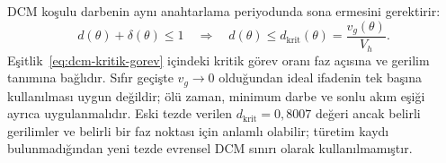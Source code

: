 DCM koşulu darbenin aynı anahtarlama periyodunda sona ermesini gerektirir:
\begin{equation}
  d(\theta)+\delta(\theta)\leq 1
  \quad\Longrightarrow\quad
  d(\theta)\leq d_{\mathrm{krit}}(\theta)=\frac{v_g(\theta)}{V_h}.
  \label{eq:dcm-kritik-gorev}
\end{equation}
Eşitlik~\eqref{eq:dcm-kritik-gorev} içindeki kritik görev oranı faz açısına ve gerilim tanımına bağlıdır. Sıfır geçişte $v_g\rightarrow0$ olduğundan ideal ifadenin tek başına kullanılması uygun değildir; ölü zaman, minimum darbe ve sonlu akım eşiği ayrıca uygulanmalıdır. Eski tezde verilen $d_{\mathrm{krit}}=0{,}8007$ değeri ancak belirli gerilimler ve belirli bir faz noktası için anlamlı olabilir; türetim kaydı bulunmadığından yeni tezde evrensel DCM sınırı olarak kullanılmamıştır.


